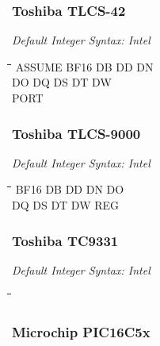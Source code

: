 \subsubsection{Toshiba TLCS-42}

{\em Default Integer Syntax: Intel}

{\tt\begin{tabbing}
\hspace{3cm}\=\hspace{3cm}\=\hspace{3cm}\=\hspace{3cm}\=\kill
ASSUME     \> BF16        \> DB         \> DD          \> DN \\
DO         \> DQ          \> DS         \> DT          \> DW \\
PORT \\
\end{tabbing}}

\subsubsection{Toshiba TLCS-9000}

{\em Default Integer Syntax: Intel}

{\tt\begin{tabbing}
\hspace{3cm}\=\hspace{3cm}\=\hspace{3cm}\=\hspace{3cm}\=\kill
BF16       \> DB         \> DD          \> DN         \> DO \\
DQ         \> DS         \> DT          \> DW         \> REG \\
\end{tabbing}}

\subsubsection{Toshiba TC9331}

{\em Default Integer Syntax: Intel}

{\tt\begin{tabbing}
\hspace{3cm}\=\hspace{3cm}\=\hspace{3cm}\=\hspace{3cm}\=\kill
\end{tabbing}}

\subsubsection{Microchip PIC16C5x}

